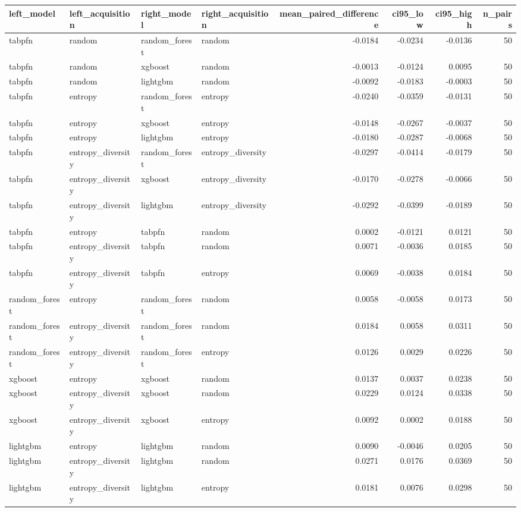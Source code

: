 \begin{tabular}{llllrrrr}
\toprule
left_model & left_acquisition & right_model & right_acquisition & mean_paired_difference & ci95_low & ci95_high & n_pairs \\
\midrule
tabpfn & random & random_forest & random & -0.0184 & -0.0234 & -0.0136 & 50 \\
tabpfn & random & xgboost & random & -0.0013 & -0.0124 & 0.0095 & 50 \\
tabpfn & random & lightgbm & random & -0.0092 & -0.0183 & -0.0003 & 50 \\
tabpfn & entropy & random_forest & entropy & -0.0240 & -0.0359 & -0.0131 & 50 \\
tabpfn & entropy & xgboost & entropy & -0.0148 & -0.0267 & -0.0037 & 50 \\
tabpfn & entropy & lightgbm & entropy & -0.0180 & -0.0287 & -0.0068 & 50 \\
tabpfn & entropy_diversity & random_forest & entropy_diversity & -0.0297 & -0.0414 & -0.0179 & 50 \\
tabpfn & entropy_diversity & xgboost & entropy_diversity & -0.0170 & -0.0278 & -0.0066 & 50 \\
tabpfn & entropy_diversity & lightgbm & entropy_diversity & -0.0292 & -0.0399 & -0.0189 & 50 \\
tabpfn & entropy & tabpfn & random & 0.0002 & -0.0121 & 0.0121 & 50 \\
tabpfn & entropy_diversity & tabpfn & random & 0.0071 & -0.0036 & 0.0185 & 50 \\
tabpfn & entropy_diversity & tabpfn & entropy & 0.0069 & -0.0038 & 0.0184 & 50 \\
random_forest & entropy & random_forest & random & 0.0058 & -0.0058 & 0.0173 & 50 \\
random_forest & entropy_diversity & random_forest & random & 0.0184 & 0.0058 & 0.0311 & 50 \\
random_forest & entropy_diversity & random_forest & entropy & 0.0126 & 0.0029 & 0.0226 & 50 \\
xgboost & entropy & xgboost & random & 0.0137 & 0.0037 & 0.0238 & 50 \\
xgboost & entropy_diversity & xgboost & random & 0.0229 & 0.0124 & 0.0338 & 50 \\
xgboost & entropy_diversity & xgboost & entropy & 0.0092 & 0.0002 & 0.0188 & 50 \\
lightgbm & entropy & lightgbm & random & 0.0090 & -0.0046 & 0.0205 & 50 \\
lightgbm & entropy_diversity & lightgbm & random & 0.0271 & 0.0176 & 0.0369 & 50 \\
lightgbm & entropy_diversity & lightgbm & entropy & 0.0181 & 0.0076 & 0.0298 & 50 \\
\bottomrule
\end{tabular}
